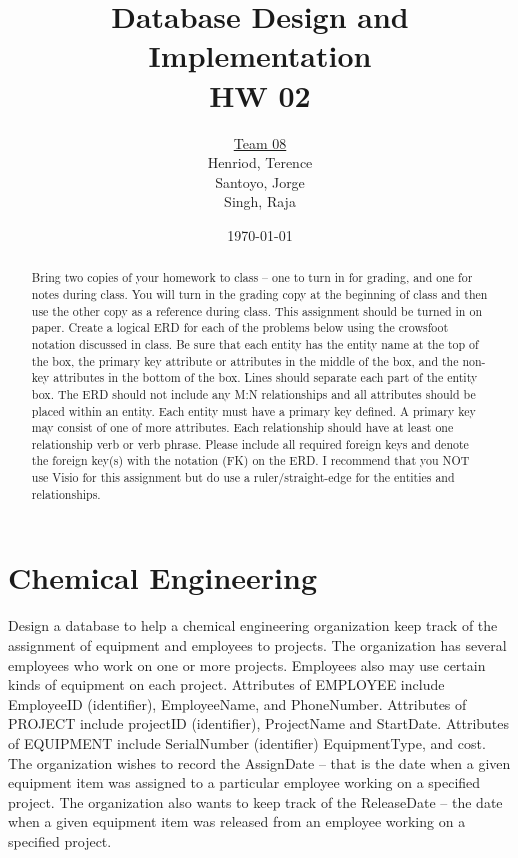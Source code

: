 \documentclass{article}
\title{Database Design and Implementation \\ HW 02}
\author{\underline{Team 08}\\Henriod, Terence\\Santoyo, Jorge \\Singh, Raja}
\date{\today}
\begin{document}
\clearpage
\maketitle
\thispagestyle{empty} %

\begin{abstract} %
Bring two copies of your homework to class – one to turn in for grading, and one for notes during class. You will turn in the grading copy at the beginning of class and then use the other copy as a reference during class. This assignment should be turned in on paper.
Create a logical ERD for each of the problems below using the crowsfoot notation discussed in class. Be sure that each entity has the entity name at the top of the box, the primary key attribute or attributes in the middle of the box, and the non-key attributes in the bottom of the box. Lines should separate each part of the entity box. The ERD should not include any M:N relationships and all attributes should be placed within an entity. Each entity must have a primary key defined. A primary key may consist of one of more attributes. Each relationship should have at least one relationship verb or verb phrase. Please include all required foreign keys and denote the foreign key(s) with the notation (FK) on the ERD. I recommend that you NOT use Visio for this assignment but do use a ruler/straight-edge for the entities and relationships.
\end{abstract}

\newpage
\section{Chemical Engineering}

Design a database to help a chemical engineering organization keep track of the assignment of equipment and employees to projects. The organization has several employees who work on one or more projects. Employees also may use certain kinds of equipment on each project. Attributes of EMPLOYEE include EmployeeID (identifier), EmployeeName, and PhoneNumber. Attributes of PROJECT include projectID (identifier), ProjectName and StartDate. Attributes of EQUIPMENT include SerialNumber (identifier) EquipmentType, and cost.\\

The organization wishes to record the AssignDate – that is the date when a given equipment item was assigned to a particular employee working on a specified project. The organization also wants to keep track of the ReleaseDate – the date when a given equipment item was released from an employee working on a specified project.\\
\end{document}
